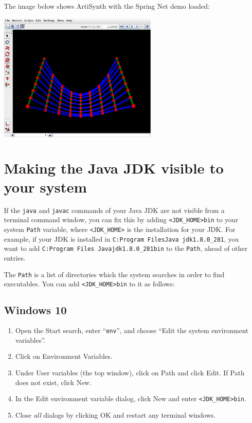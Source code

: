 The image below shows ArtiSynth with the {\sf Spring Net} demo loaded:

\begin{center}
   \includegraphics[width=0.60\textwidth]{images/SpringNetDemo}
\end{center}

\section{Making the Java JDK visible to your system}
\label{MakingJDKVisible:sec}

If the {\tt java} and {\tt javac} commands of your Java JDK are not
visible from a terminal command window, 
\ifWindows
you can fix this by adding
{\tt <JDK\_HOME>\BKS bin} to your system {\tt Path} variable, where
{\tt <JDK\_HOME>} is the installation \directory{} for your JDK. For example, if
your JDK is installed in {\tt C:\BKS Program Files\BKS Java\BKS
jdk1.8.0\_281}, you want to add {\tt C:\BKS Program Files\BKS
Java\BKS jdk1.8.0\_281\BKS bin} to the {\tt Path}, ahead of other
entries.

The {\tt Path} is a list of directories which the system searches in
order to find executables. You can add {\tt <JDK\_HOME>\BKS bin} 
to it as follows:

\subsection*{Windows 10}

\begin{enumerate}

\item Open the {\sf Start} search, enter ``{\tt env}'', and choose
{\sf ``Edit the system environment variables''}.

\item Click on {\sf Environment Variables}.

\item Under {\sf User variables} (the top window), click on {\sf Path}
and click {\sf Edit}. If {\sf Path} does not exist, click {\sf New}.

\item In the {\sf Edit environment variable} dialog, click {\sf New}
and enter {\tt<JDK\_HOME>\BKS bin}.

\item Close {\it all} dialogs by clicking {\sf OK} and restart 
any terminal windows.

\end{enumerate}

